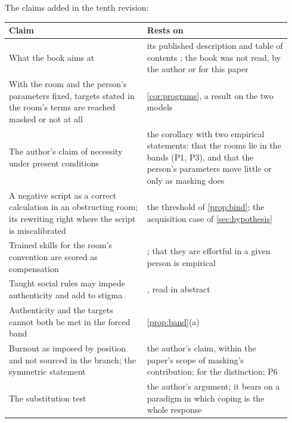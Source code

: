 \noindent The claims added in the tenth revision:
\begin{center}\small
\begin{tabular}{p{0.46\linewidth} p{0.48\linewidth}}
\toprule
Claim & Rests on \\
\midrule
What the book aims at & its published description and table of contents \cite{GoldsteinBrooks2026}; the book was not read, by the author or for this paper \\
With the room and the person's parameters fixed, targets stated in the room's terms are reached masked or not at all & \autoref{cor:programs}, a result on the two models \\
The author's claim of necessity under present conditions & the corollary with two empirical statements: that the rooms lie in the bands (P1, P3), and that the person's parameters move little or only as masking does \\
A negative script as a correct calculation in an obstructing room; its rewriting right where the script is miscalibrated & the threshold of \autoref{prop:bind}; the acquisition case of \autoref{sec:hypothesis} \\
Trained skills for the room's convention are scored as compensation & \cite{Hull2019, Livingston2019}; that they are effortful in a given person is empirical \\
Taught social rules may impede authenticity and add to stigma & \cite{BottemaBeutel2018}, read in abstract \\
Authenticity and the targets cannot both be met in the forced band & \autoref{prop:band}(a) \\
Burnout as imposed by position and not sourced in the branch; the symmetric statement & the author's claim, within the paper's scope of masking's contribution; \cite{Oliver1990, Botha2020} for the distinction; P6 \\
The substitution test & the author's argument; it bears on a paradigm in which coping is the whole response \\
\bottomrule
\end{tabular}
\end{center}

